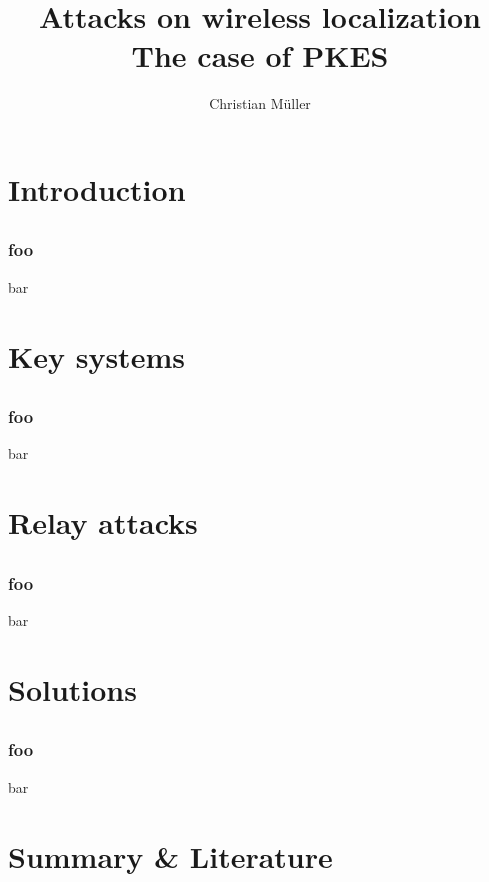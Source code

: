 \documentclass[12pt]{beamer}
\title{Attacks on wireless localization\\The case of PKES}
\author{Christian Müller}
\begin{document}
\begin{frame}
	\titlepage
\end{frame}

\begin{frame}
	\tableofcontents
\end{frame}

\section{Introduction}
\subsection*{}
\begin{frame}
	\frametitle{foo}
	bar
\end{frame}

\section{Key systems}
\subsection*{}
\begin{frame}
	\frametitle{foo}
	bar
\end{frame}

\section{Relay attacks}
\subsection*{}
\begin{frame}
	\frametitle{foo}
	bar
\end{frame}

\section{Solutions}
\subsection*{}
\begin{frame}
	\frametitle{foo}
	bar
\end{frame}

\section{Summary \& Literature}
\end{document}
